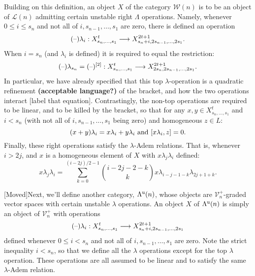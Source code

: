 \documentclass[11pt]{amsart}
\theoremstyle{plain}
\theoremstyle{definition}
\newcommand{\DASH}{\textup{--}}
\renewcommand{\to}{\longrightarrow}
\newcommand{\calW}{\mathcal{W}}
\newcommand{\calL}{\mathcal{L}}
\newcommand{\calV}{\mathcal{V}}
\theoremstyle{plain}
\newcommand{\LambdaMonad}{\Lambda^\textup{u}}
\newcommand{\restn}[1]{#1^{[2]}}
\newcommand{\vect}[2]{\calV^{#1}_{#2}}
\begin{document}
\begin{Unstable Lie algebras over the Lambda-algebra}
Building on this definition, an object $X$ of the category $\calW(n)$ is to be an object of $\calL(n)$ admitting certain unstable right $\Lambda$ operations. Namely, whenever $0\leq i\leq s_n$ and not all of $i,s_{n-1},\ldots,s_{1}$ are zero, there is defined an operation
\[(\DASH)\lambda_i:X^t_{s_n,\ldots,s_1}\to X^{2t+1}_{s_n+i,2s_{n-1},\ldots,2s_1}.\]
When $i=s_n$ (and $\lambda_i$ is defined) it is required to equal the restriction:
\[(\DASH)\lambda_{s_n}=\restn{(\DASH)}:X^t_{s_n,\ldots,s_1}\to X^{2t+1}_{2s_n,2s_{n-1},\ldots,2s_1}.\]
In particular, we have already specified that this top $\lambda$-operation is a quadratic refinement \textbf{(acceptable language?)} of the bracket, and how the two operations interact [label that equation]. Contrastingly, the non-top operations are required to be linear, and to be killed by the bracket, so that for any $x,y\in X^t_{s_n,\ldots,s_1}$ and $i<s_n$ (with not all of $i,s_{n-1},\ldots,s_{1}$ being zero) and homogeneous $z\in L$:
\[(x+y)\lambda_i=x\lambda_i+y\lambda_i\textup{ and }[x\lambda_i,z]=0.\]
Finally, these right operations satisfy the $\lambda$-Adem relations. That is, whenever $i>2j$, and $x$ is a homogeneous element of $X$ with $x\lambda_j\lambda_i$ defined:
\[x\lambda_j\lambda_i=\sum_{k=0}^{(i-2j)/2-1}{i-2j-2-k\choose k}x\lambda_{i-j-1-k}\lambda_{2j+1+k}.\]

{\tiny[Moved]Next, we'll define another category, $\LambdaMonad(n)$, whose objects are $\vect{+}{n}$-graded vector spaces with certain unstable $\lambda$ operations. An object $X$ of $\LambdaMonad(n)$ is simply an object of $\vect{+}{n}$ with operations
\[(\DASH)\lambda_i:X^t_{s_n,\ldots,s_1}\to X^{2t+1}_{s_n+i,2s_{n-1},\ldots,2s_1}\]
defined whenever $0\leq i< s_n$ and not all of $i,s_{n-1},\ldots,s_{1}$ are zero. Note the strict inequality $i<s_n$, so that we define all the $\lambda$ operations except for the top $\lambda$ operation. These operations are all assumed to be linear and to satisfy the same $\lambda$-Adem relation.

}
\end{Unstable Lie algebras over the Lambda-algebra}
\end{document}
